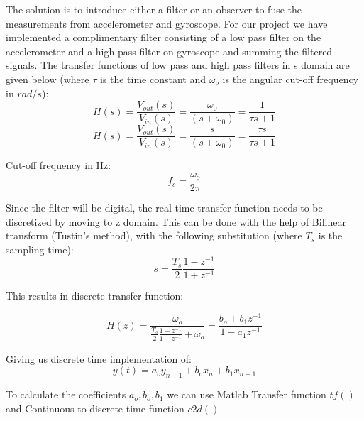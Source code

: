 The solution is to introduce either a filter or an observer to fuse the measurements from accelerometer and gyroscope. For our project we have implemented a complimentary filter consisting of a low pass filter on the accelerometer and a high pass filter on gyroscope and summing the filtered signals.
\newline
The transfer functions of low pass and high pass filters in s domain are given below (where $\tau$ is the time constant and $\omega _o$ is the angular cut-off frequency in $rad/s$):\newline 
\begin{displaymath}
H(s) = \frac{V_{out}(s)}{V_{in}(s)} = \frac{\omega_0}{(s+\omega_0)}= \frac{1}{\tau s+1}
\end{displaymath}
\begin{displaymath}
H(s) = \frac{V_{out}(s)}{V_{in}(s)} = \frac{s}{(s+\omega_0)}= \frac{\tau s}{\tau s+1}
\end{displaymath}

Cut-off frequency in Hz:
\begin{displaymath}
    f_c=\frac{\omega _o}{2\pi}
\end{displaymath}
\newline

Since the filter will be digital, the real time transfer function needs to be discretized by moving to z domain. This can be done with the help of Bilinear transform (Tustin's method), with the following substitution (where $T_s$ is the sampling time):
\begin{displaymath}
    s=\frac{T_s}{2}\frac{1-z^{-1}}{1+z^{-1}}
\end{displaymath}


 This results in discrete transfer function: 



\begin{displaymath}
    H(z)= \frac{\omega _o}{\frac{T_s}{2}\frac{1-z^{-1}}{1+z^{-1}} + \omega _o}=\frac{b_o + b_1z^{-1}}{1-a_1z^{-1}}
\end{displaymath}

Giving us discrete time implementation of:  
\begin{displaymath}
    y(t)=a_o y_{n-1}+b_ox_n+b_1x_{n-1}
\end{displaymath}

To calculate the coefficients $a_o, b_o, b_1$ we can use Matlab Transfer function $tf()$ and Continuous to discrete time function $c2d() $


